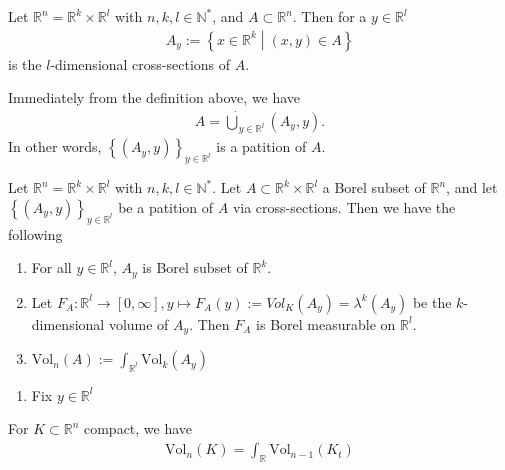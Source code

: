 \begin{definition}
    Let \(\mathbb{R}^n = \mathbb{R}^k \times \mathbb{R}^l\) with \(n, k, l \in \mathbb{N}^*\), and \(A \subset \mathbb{R}^n\). Then for a \(y \in \mathbb{R}^l\)
    \begin{align}
        A_y := \left\{ x \in \mathbb{R}^k \middle| (x, y) \in A \right\}
    \end{align}
    is the \(l\)-dimensional cross-sections of \(A\).
\end{definition}
\begin{remark}
    Immediately from the definition above, we have
    \begin{align}
        A = \dot\bigcup_{y \in \mathbb{R}^l}(A_y, y) \text{.}
    \end{align}
    In other words, \( \left\{(A_y, y)\right\}_{y \in \mathbb{R}^l}\) is a patition of \(A\).
\end{remark}
\begin{theorem}
    Let {\color{mathif}\(\mathbb{R}^n = \mathbb{R}^k \times \mathbb{R}^l\)} with {\color{mathif}\(n, k, l \in \mathbb{N}^*\)}. Let {\color{mathif}\(A \subset \mathbb{R}^k \times \mathbb{R}^l\)} a {\color{mathif}Borel subset} of {\color{mathif}\(\mathbb{R}^n\)}, and let {\color{mathif}\( \left\{(A_y, y)\right\}_{y \in \mathbb{R}^l}\)} be a {\color{mathif}patition} of {\color{mathif}\(A\)} via {\color{mathif}cross-sections}. Then we have the following
    \begin{enumerate}
        \item For all {\color{maththen}\(y \in \mathbb{R}^l\)}, {\color{maththen}\(A_y\)} is {\color{maththen}Borel subset} of {\color{maththen}\(\mathbb{R}^k\)}.
        \item Let \(F_A: \mathbb{R}^l \rightarrow [0, \infty], y \mapsto F_A(y) := Vol_K(A_y) = \lambda^k (A_y)\) be the \(k\)-dimensional volume of \(A_y\). Then \(F_A\) is Borel measurable on \(\mathbb{R}^l\).
        \item \(\text{Vol}_n(A) := \int_{\mathbb{R}^l} \text{Vol}_k (A_y)\)
    \end{enumerate}
\end{theorem}
\proof
\begin{enumerate}
    \item Fix \(y \in \mathbb{R}^l\)
\end{enumerate}
\begin{corollary}
    For \(K \subset \mathbb{R}^n\) compact, we have
    \begin{align}
        \text{Vol}_n (K) = \int_{\mathbb{R}} \text{Vol}_{n-1}(K_t)
    \end{align}
\end{corollary}
